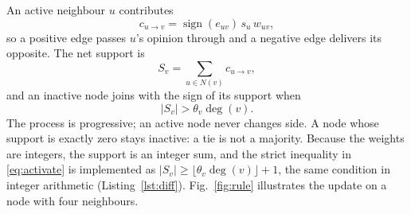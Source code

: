 \documentclass[journal,letterpaper,10pt]{IEEEtran}
\begin{document}
An active neighbour $u$ contributes
\begin{equation}
c_{u\to v}=\operatorname{sign}(e_{uv})\,s_u\,w_{uv},
\label{eq:contrib}
\end{equation}
so a positive edge passes $u$'s opinion through and a negative edge delivers its opposite. The net support is
\begin{equation}
S_v=\sum_{u\in N(v)}c_{u\to v},
\label{eq:support}
\end{equation}
and an inactive node joins with the sign of its support when
\begin{equation}
|S_v|>\theta_v\deg(v).
\label{eq:activate}
\end{equation}
The process is progressive; an active node never changes side. A node whose support is exactly zero stays inactive: a tie is not a majority. Because the weights are integers, the support is an integer sum, and the strict inequality in \eqref{eq:activate} is implemented as $|S_v|\ge\lfloor\theta_v\deg(v)\rfloor+1$, the same condition in integer arithmetic (Listing~\ref{lst:diff}). Fig.~\ref{fig:rule} illustrates the update on a node with four neighbours.
\end{document}
